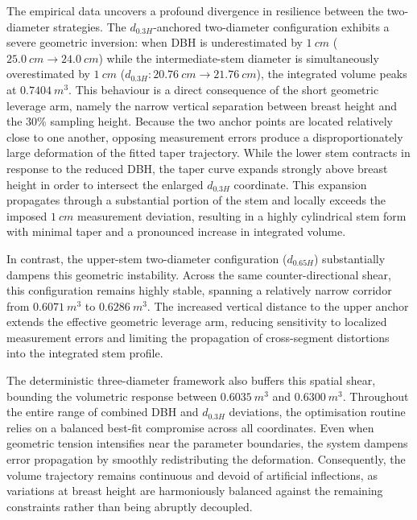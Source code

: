 \documentclass[twocolumn, bibliography=totoc]{scrartcl}
\begin{document}
The empirical data uncovers a profound divergence in resilience between the two-diameter strategies. The $d_{0.3H}$-anchored two-diameter configuration exhibits a severe geometric inversion: when DBH is underestimated by $\qty{1}{cm}$ ($\qty{25.0}{cm} \rightarrow \qty{24.0}{cm}$) while the intermediate-stem diameter is simultaneously overestimated by $\qty{1}{cm}$ ($d_{0.3H}: \qty{20.76}{cm} \rightarrow \qty{21.76}{cm}$), the integrated volume peaks at $\qty{0.7404}{m^3}$. This behaviour is a direct consequence of the short geometric leverage arm, namely the narrow vertical separation between breast height and the 30\% sampling height. Because the two anchor points are located relatively close to one another, opposing measurement errors produce a disproportionately large deformation of the fitted taper trajectory. While the lower stem contracts in response to the reduced DBH, the taper curve expands strongly above breast height in order to intersect the enlarged $d_{0.3H}$ coordinate. This expansion propagates through a substantial portion of the stem and locally exceeds the imposed $\qty{1}{cm}$ measurement deviation, resulting in a highly cylindrical stem form with minimal taper and a pronounced increase in integrated volume.

In contrast, the upper-stem two-diameter configuration ($d_{0.65H}$) substantially dampens this geometric instability. Across the same counter-directional shear, this configuration remains highly stable, spanning a relatively narrow corridor from $\qty{0.6071}{m^3}$ to $\qty{0.6286}{m^3}$. The increased vertical distance to the upper anchor extends the effective geometric leverage arm, reducing sensitivity to localized measurement errors and limiting the propagation of cross-segment distortions into the integrated stem profile.

The deterministic three-diameter framework also buffers this spatial shear, bounding the volumetric response between $\qty{0.6035}{m^3}$ and $\qty{0.6300}{m^3}$. Throughout the entire range of combined DBH and $d_{0.3H}$ deviations, the optimisation routine relies on a balanced best-fit compromise across all coordinates. Even when geometric tension intensifies near the parameter boundaries, the system dampens error propagation by smoothly redistributing the deformation. Consequently, the volume trajectory remains continuous and devoid of artificial inflections, as variations at breast height are harmoniously balanced against the remaining constraints rather than being abruptly decoupled.
\end{document}
